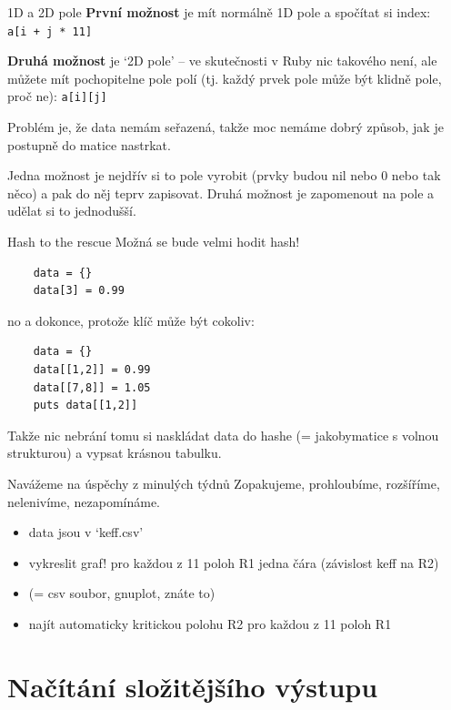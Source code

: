 \documentclass{beamer}
\begin{document}
\begin{frame}[fragile]{1D a 2D pole}
  \textbf{První možnost} je mít normálně 1D pole a spočítat si index:\\
  \texttt{a[i + j * 11]}
  \pause


  \textbf{Druhá možnost} je `2D pole' -- ve skutečnosti v Ruby nic takového není, ale můžete mít pochopitelne pole polí (tj. každý prvek pole může být klidně pole, proč ne):
  \texttt{a[i][j]}
  \pause

  Problém je, že data nemám seřazená, takže moc nemáme dobrý způsob, jak je postupně do matice nastrkat.

  Jedna možnost je nejdřív si to pole vyrobit (prvky budou nil nebo 0 nebo tak něco) a pak do něj teprv zapisovat.
  Druhá možnost je zapomenout na pole a udělat si to jednodušší.
\end{frame}

\begin{frame}[fragile]{Hash to the rescue}
  Možná se bude velmi hodit hash!
  {\scriptsize
  \begin{verbatim}
    data = {}
    data[3] = 0.99
  \end{verbatim}
  }
  \pause
  no a dokonce, protože klíč může být cokoliv:
  {\scriptsize
  \begin{verbatim}
    data = {}
    data[[1,2]] = 0.99
    data[[7,8]] = 1.05
    puts data[[1,2]]
  \end{verbatim}
  }
  Takže nic nebrání tomu si naskládat data do hashe (= jakobymatice s volnou strukturou) a vypsat krásnou tabulku.
\end{frame}

\begin{frame}{Navážeme na úspěchy z minulých týdnů}
  Zopakujeme, prohloubíme, rozšíříme, nelenivíme, nezapomínáme.
  \begin{itemize}
    \item data jsou v `keff.csv'
    \item vykreslit graf! pro každou z 11 poloh R1 jedna čára (závislost keff na R2)
    \item (= csv soubor, gnuplot, znáte to)
    \item najít automaticky kritickou polohu R2 pro každou z 11 poloh R1
  \end{itemize}
\end{frame}


\section{Načítání složitějšího výstupu}
\end{document}
